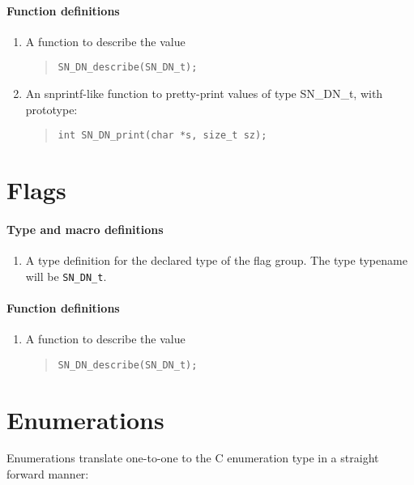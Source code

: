 \documentclass[a4paper,11pt,twoside]{report}
\begin{document}
{{\paragraph{Function definitions}
\begin{enumerate}
  \item A function to describe the value 
        \begin{quote}
          \texttt{SN\_DN\_describe(SN\_DN\_t);}
        \end{quote}

  \item An snprintf-like function to pretty-print values of type SN\_DN\_t, 
        with prototype:
        \begin{quote}
          \texttt{int SN\_DN\_print(char *s, size\_t sz);}
        \end{quote}

\end{enumerate}

\section{Flags}

\paragraph{Type and macro definitions}
\begin{enumerate}
  \item A type definition for the declared type of the flag group. The 
        type typename will be \texttt{SN\_DN\_t}.
\end{enumerate}

\paragraph{Function definitions}
\begin{enumerate}
  \item A function to describe the value 
        \begin{quote}
          \texttt{SN\_DN\_describe(SN\_DN\_t);}
        \end{quote}
\end{enumerate}

\section{Enumerations}
Enumerations translate one-to-one to the C enumeration type in a straight 
forward manner:

}}
\end{document}
